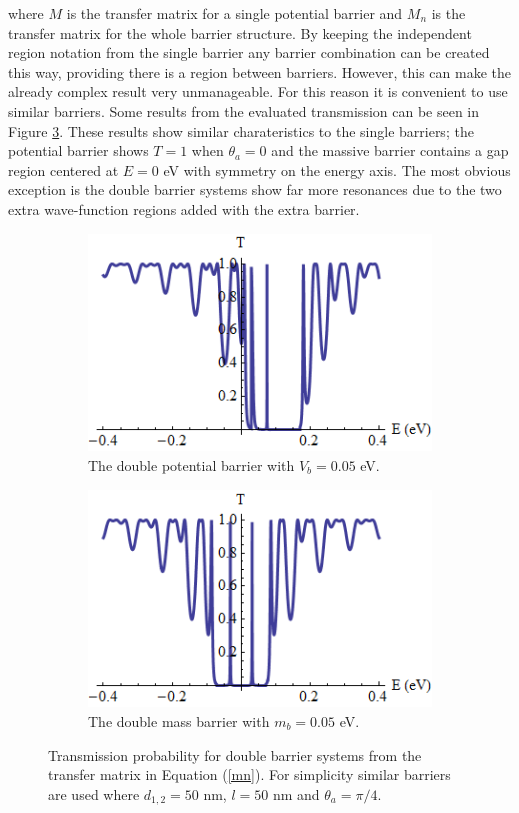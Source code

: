 \documentclass[12pt,a4paper]{report}
\begin{document}
				where $M$ is the transfer matrix for a single potential barrier and $M_{n}$ is the transfer matrix for the whole barrier structure. By keeping the independent region notation from the single barrier any barrier combination can be created this way, providing there is a region between barriers. However, this can make the already complex result very unmanageable. For this reason it is convenient to use similar barriers. Some results from the evaluated transmission can be seen in Figure \ref{doubletransmissionplot}. These results show similar charateristics to the single barriers; the potential barrier shows $T=1$ when $\theta_{a}=0$ and the massive barrier contains a gap region centered at $E=0$ eV with symmetry on the energy axis. The most obvious exception is the double barrier systems show far more resonances due to the two extra wave-function regions added with the extra barrier.
\begin{figure}
	\begin{subfigure}{0.5\textwidth}
		\centerline{\includegraphics[scale=0.6]{images/double-potential}}
		\caption{The double potential barrier with $V_{b}=0.05$ eV.}
		\label{doubletransmissionplota}
	\end{subfigure}
	\hspace{0.6cm}
	\begin{subfigure}{0.5\textwidth}
		\centerline{\includegraphics[scale=0.6]{images/double-mass}}
		\caption{The double mass barrier with $m_{b}=0.05$ eV.}
		\label{doubletransmissionplotb}
	\end{subfigure}
	\caption{Transmission probability for double barrier systems from the transfer matrix in Equation (\ref{mn}). For simplicity similar barriers are used where $d_{1,2}=50$ nm, $l=50$ nm and $\theta_{a}=\pi/4$.}
	\label{doubletransmissionplot}
\end{figure}
\end{document}
